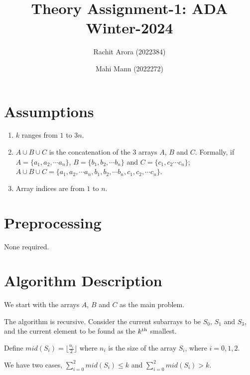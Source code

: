 \documentclass{article}
\title{Theory Assignment-1: ADA Winter-2024}
\author{Rachit Arora (2022384) \and Mahi Mann (2022272)}
\date{}
\begin{document}
\maketitle

\section{Assumptions}

\begin{enumerate}
    \item $k$ ranges from $1$ to $3n$.
    \item $A \cup B \cup C$ is the concatenation of the 3 arrays $A$, $B$ and $C$. Formally, if $A = \{ a_1 , a_2 , \cdots a_n \}$, $B = \{ b_1 , b_2 , \cdots b_n \}$ and $C = \{ c_1 , c_2 \cdots c_n \}$; $A \cup B \cup C = \{ a_1 , a_2 , \cdots a_n , b_1 , b_2 , \cdots b_n , c_1 , c_2 , \cdots c_n\}$.   
    \item Array indices are from $1$ to $n$.
\end{enumerate}

\section{Preprocessing}

None required.

\section{Algorithm Description}

We start with the arrays $A$, $B$ and $C$ as the main problem.

The algorithm is recursive. Consider the current subarrays to be $S_0$, $S_1$ and $S_3$, and the current element to be found as the $k\textsuperscript{th}$ smallest.

Define $mid(S_i) = \lfloor \frac{n_i}{2} \rfloor$ where $n_i$ is the size of the array $S_i$, where $i = 0,1,2$.  

We have two cases, $\sum_{i=0}^{2} mid(S_i) \leq k$ and $\sum_{i=0}^{2} mid(S_i) > k$. 
\end{document}
